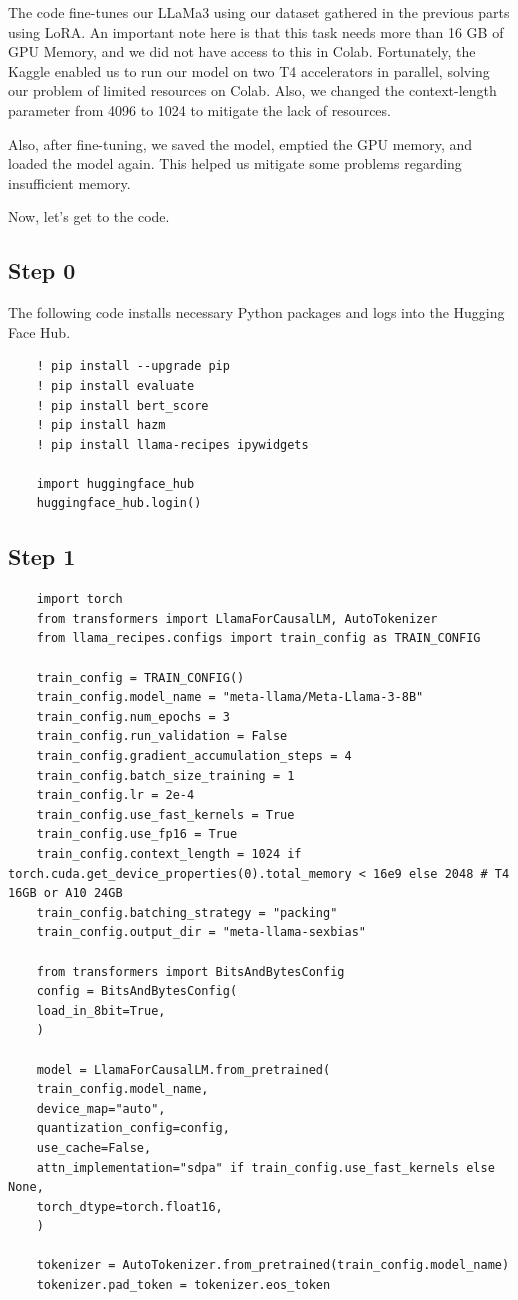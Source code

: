 \documentclass{solutionclass} %
\begin{document}
The code fine-tunes our LLaMa3 using our dataset gathered in the previous parts using LoRA. An important note here is that this task needs more than 16 GB of GPU Memory, and we did not have access to this in Colab. Fortunately, the Kaggle enabled us to run our model on two T4 accelerators in parallel, solving our problem of limited resources on Colab. Also, we changed the context-length parameter from 4096 to 1024 to mitigate the lack of resources.

Also, after fine-tuning, we saved the model, emptied the GPU memory, and loaded the model again. This helped us mitigate some problems regarding insufficient memory.

Now, let's get to the code.

\subsection*{Step 0}

The following code installs necessary Python packages and logs into the Hugging Face Hub.

\begin{verbatim}
	! pip install --upgrade pip
	! pip install evaluate
	! pip install bert_score
	! pip install hazm
	! pip install llama-recipes ipywidgets
	
	import huggingface_hub
	huggingface_hub.login()
\end{verbatim}


\subsection*{Step 1}


\begin{lstlisting}
	import torch
	from transformers import LlamaForCausalLM, AutoTokenizer
	from llama_recipes.configs import train_config as TRAIN_CONFIG
	
	train_config = TRAIN_CONFIG()
	train_config.model_name = "meta-llama/Meta-Llama-3-8B"
	train_config.num_epochs = 3
	train_config.run_validation = False
	train_config.gradient_accumulation_steps = 4
	train_config.batch_size_training = 1
	train_config.lr = 2e-4
	train_config.use_fast_kernels = True
	train_config.use_fp16 = True
	train_config.context_length = 1024 if torch.cuda.get_device_properties(0).total_memory < 16e9 else 2048 # T4 16GB or A10 24GB
	train_config.batching_strategy = "packing"
	train_config.output_dir = "meta-llama-sexbias"
	
	from transformers import BitsAndBytesConfig
	config = BitsAndBytesConfig(
	load_in_8bit=True,
	)
	
	model = LlamaForCausalLM.from_pretrained(
	train_config.model_name,
	device_map="auto",
	quantization_config=config,
	use_cache=False,
	attn_implementation="sdpa" if train_config.use_fast_kernels else None,
	torch_dtype=torch.float16,
	)
	
	tokenizer = AutoTokenizer.from_pretrained(train_config.model_name)
	tokenizer.pad_token = tokenizer.eos_token
\end{lstlisting}
\end{document}
